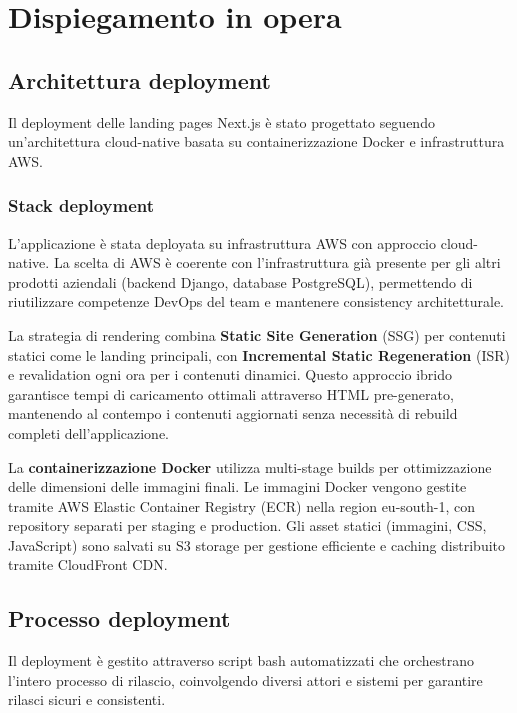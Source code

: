 \chapter{Dispiegamento in opera}

\section{Architettura deployment}

Il deployment delle landing pages Next.js è stato progettato seguendo 
un'architettura cloud-native basata su containerizzazione Docker e 
infrastruttura AWS.

\subsection{Stack deployment}

L'applicazione è stata deployata su infrastruttura AWS con approccio cloud-native. 
La scelta di AWS è coerente con l'infrastruttura già presente per gli altri 
prodotti aziendali (backend Django, database PostgreSQL), permettendo di 
riutilizzare competenze DevOps del team e mantenere consistency architetturale.

La strategia di rendering combina \textbf{Static Site Generation} (SSG) per 
contenuti statici come le landing principali, con \textbf{Incremental Static 
Regeneration} (ISR) e revalidation ogni ora per i contenuti dinamici. 
Questo approccio ibrido garantisce tempi di caricamento ottimali attraverso 
HTML pre-generato, mantenendo al contempo i contenuti aggiornati senza 
necessità di rebuild completi dell'applicazione.

La \textbf{containerizzazione Docker} utilizza multi-stage builds per 
ottimizzazione delle dimensioni delle immagini finali. Le immagini Docker 
vengono gestite tramite AWS Elastic Container Registry (ECR) nella region 
eu-south-1, con repository separati per staging e production. Gli asset statici 
(immagini, CSS, JavaScript) sono salvati su S3 storage per gestione efficiente 
e caching distribuito tramite CloudFront CDN.

\section{Processo deployment}

Il deployment è gestito attraverso script bash automatizzati che orchestrano 
l'intero processo di rilascio, coinvolgendo diversi attori e sistemi per 
garantire rilasci sicuri e consistenti.

